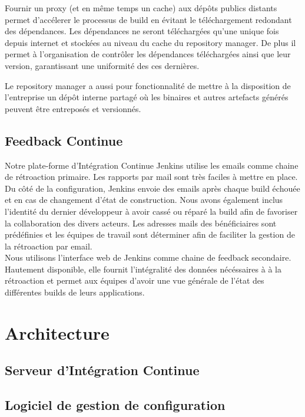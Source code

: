       Fournir un proxy (et en même temps un cache) aux dépôts publics distants permet d'accélerer le processus de build en évitant le téléchargement redondant des dépendances. Les dépendances ne seront téléchargées qu'une unique fois depuis internet et stockées au niveau du cache du repository manager. De plus il permet à l'organisation de contrôler les dépendances téléchargées ainsi que leur version, garantissant une uniformité des ces dernières.

      Le repository manager a aussi pour fonctionnalité de mettre à la disposition de l'entreprise un dépôt interne partagé où les binaires et autres artefacts générés peuvent être entreposés et versionnés.\\

    \subsection{Feedback Continue}
    Notre plate-forme d'Intégration Continue Jenkins utilise les emails comme chaine de rétroaction primaire. Les rapports par mail sont très faciles à mettre en place. Du côté de la configuration, Jenkins envoie des emails après chaque build échouée et en cas de changement d'état de construction. Nous avons également inclus l'identité du dernier développeur à avoir cassé ou réparé la build afin de favoriser la collaboration des divers acteurs. Les adresses mails des bénéficiaires sont prédéfinies et les équipes de travail sont déterminer afin de faciliter la gestion de la rétroaction par email.\\

    Nous utilisons l'interface web de Jenkins comme chaine de feedback secondaire. Hautement disponible, elle fournit l'intégralité des données nécéssaires à à la rétroaction et permet aux équipes d'avoir une vue générale de l'état des différentes builds de leurs applications.

  \section{Architecture}

    \subsection{Serveur d’Intégration Continue}

    \subsection{Logiciel de gestion de configuration}

